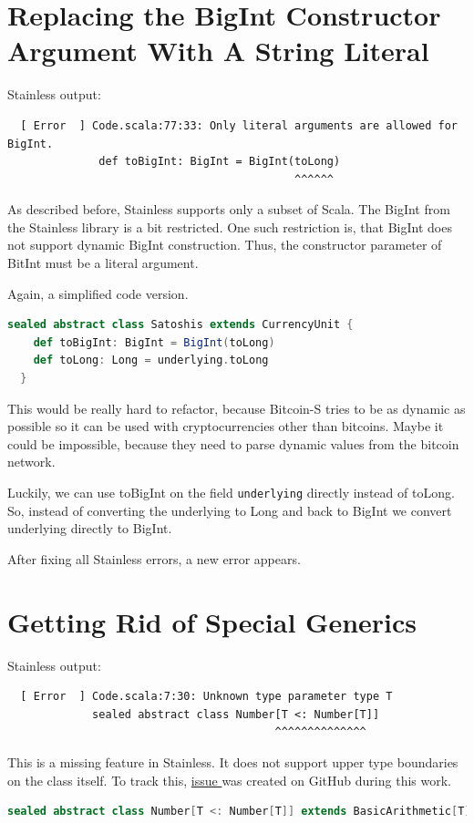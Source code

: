 \section{Replacing the BigInt Constructor Argument With A String Literal}

Stainless output:
{\footnotesize\begin{verbatim}
  [ Error  ] Code.scala:77:33: Only literal arguments are allowed for BigInt.
              def toBigInt: BigInt = BigInt(toLong)
                                            ^^^^^^
\end{verbatim}}

As described before, Stainless supports only a subset of Scala.
The BigInt from the Stainless library is a bit restricted.
One such restriction is, that BigInt does not support dynamic BigInt construction.
Thus, the constructor parameter of BitInt must be a literal argument.

Again, a simplified code version.
\begin{lstlisting}[language=scala]
  sealed abstract class Satoshis extends CurrencyUnit { 
    def toBigInt: BigInt = BigInt(toLong)
    def toLong: Long = underlying.toLong
  }
\end{lstlisting}

This would be really hard to refactor, because Bitcoin-S tries to be as dynamic as possible so it can be used with cryptocurrencies other than bitcoins.
Maybe it could be impossible, because they need to parse dynamic values from the bitcoin network.

Luckily, we can use toBigInt on the field \texttt{underlying} directly instead of toLong.
So, instead of converting the underlying to Long and back to BigInt we convert underlying directly to BigInt.

After fixing all Stainless errors, a new error appears.


\section{Getting Rid of Special Generics}

Stainless output:
{\footnotesize\begin{verbatim}
  [ Error  ] Code.scala:7:30: Unknown type parameter type T
             sealed abstract class Number[T <: Number[T]]
                                         ^^^^^^^^^^^^^^
\end{verbatim}}

This is a missing feature in Stainless.
It does not support upper type boundaries on the class itself.
To track this, \href{https://github.com/epfl-lara/stainless/issues/519}{issue } was created on GitHub during this work.
\begin{lstlisting}[language=scala]
  sealed abstract class Number[T <: Number[T]] extends BasicArithmetic[T]  
\end{lstlisting}

